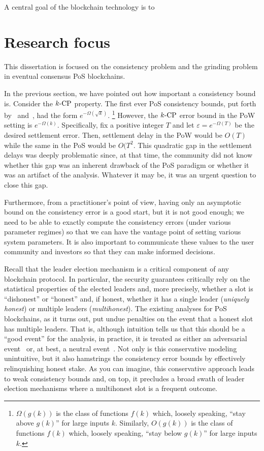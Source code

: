 A central goal of the blockchain technology is to 



\section{Research focus}\label{sec:intro-focus}
This dissertation is focused on the consistency problem and the grinding problem in 
eventual consensus PoS blockchains. 

In the previous section, 
we have pointed out how important a consistency bound is. 
Consider the ${k}\text{-}\mathrm{CP}$ property.
The first ever PoS consistency bounds, 
put forth by~\citet{Ouroboros} and~\citet{SnowWhite}, 
had the form $e^{-\Omega(\sqrt{k})}$. \footnote{
  $\Omega(g(k))$ is the class of functions $f(k)$ 
  which, loosely speaking, 
  ``stay above $g(k)$'' for large inputs $k$.
  Similarly, $O(g(k))$ is the class of functions $f(k)$ 
  which, loosely speaking, 
  ``stay below $g(k)$'' for large inputs $k$.
}
However, the ${k}\text{-}\mathrm{CP}$ error bound in the PoW setting is $e^{-\Omega(k)}$. 
Specifically, fix a positive integer $T$ and let $\varepsilon = e^{-\Omega(T)}$ 
be the desired settlement error. 
Then, settlement delay in the PoW would be $O(T)$ while 
the same in the PoS would be $O(T^2$. 
This quadratic gap in the settlement delays 
was deeply problematic since, 
at that time, 
the community did not know whether this gap 
was an inherent drawback of the PoS paradigm 
or whether it was an artifact of the analysis. 
Whatever it may be, 
it was an urgent question to close this gap. 

Furthermore, from a practitioner's point of view, 
having only an asymptotic bound on the consistency error is a good start, 
but it is not good enough; 
we need to be able to exactly compute the consistency errors 
(under various parameter regimes) 
so that we can have the vantage point of setting 
various system parameters. 
It is also important to communicate these values 
to the user community and investors 
so that they can make informed decisions.


Recall that the leader election mechanism is a 
critical component of any blockchain protocol. 
In particular, 
the security guarantees critically rely on the 
statistical properties of the elected leaders 
and, more precisely, 
whether a slot is ``dishonest'' or ``honest'' 
and, if honest, whether it has a single leader (\emph{uniquely honest}) 
or multiple leaders (\emph{multihonest}).
The existing analyses for PoS blockchains, 
as it turns out, 
put undue penalties on the event that a honest slot has multiple leaders. 
That is, although intuition tells us that this should be a ``good event'' for the analysis, 
in practice, it is treated as either an adversarial event~\cite{Ouroboros,Praos,Genesis} 
or, at best, a neutral event~\cite{SnowWhite,Sleepy}. 
Not only is this conservative modeling unintuitive, 
but it also hamstrings the consistency error bounds 
by effectively relinquishing honest stake. 
As you can imagine, this conservative approach leads to weak consistency bounds 
and, on top, it precludes a broad swath of leader election mechanisms 
where a multihonest slot is a frequent outcome.



